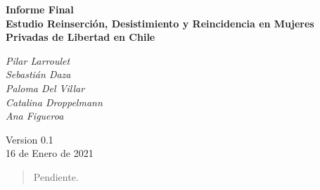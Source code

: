 \documentclass[11pt]{report}
\begin{document}

\thispagestyle{empty}

\renewcommand{\baselinestretch}{1}

\vspace*{60pt}

\begin{center}
\LARGE \textbf{Informe Final}\\
\vspace*{6pt}
\LARGE \textbf{Estudio Reinserción, Desistimiento y Reincidencia en Mujeres Privadas de Libertad en Chile} \\
\vspace*{24pt}

\vspace*{36pt}
\begin{center}
\large
\emph{Pilar Larroulet} \\
\emph{Sebastián Daza} \\
\emph{Paloma Del Villar} \\
\emph{Catalina Droppelmann} \\
\emph{Ana Figueroa} \\
\end{center}

\end{center}

\begin{center}
\normalsize



\vspace{100pt}
Version 0.1\\
16 de Enero de 2021
\end{center}

\setcounter{page}{1}

\renewcommand{\abstractname}{\Large Prólogo}
\begin{abstract}

\setlength\parskip{11pt}
Pendiente.
\end{abstract}

\newpage
\tableofcontents
\newpage
\listoftables
\newpage
\listoffigures
\end{document}
